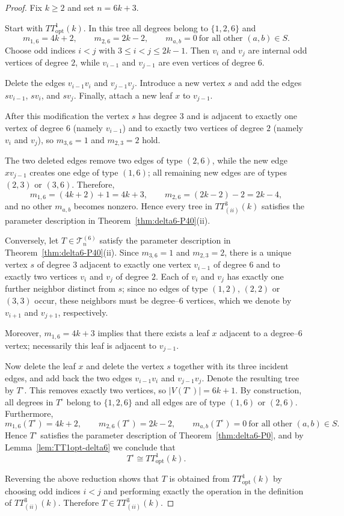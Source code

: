 \documentclass[preprint,12pt]{elsarticle}
\begin{document}
\begin{proof}
Fix $k\ge 2$ and set $n=6k+3$.

Start with $TT^1_{\mathrm{opt}}(k)$.
In this tree all degrees belong to $\{1,2,6\}$ and
\[
m_{1,6}=4k+2,\qquad m_{2,6}=2k-2,
\qquad m_{a,b}=0\ \text{for all other }(a,b)\in S .
\]
Choose odd indices $i<j$ with $3\le i<j\le 2k-1$.
Then $v_i$ and $v_j$ are internal odd vertices of degree $2$, while
$v_{i-1}$ and $v_{j-1}$ are even vertices of degree $6$.

Delete the edges $v_{i-1}v_i$ and $v_{j-1}v_j$.
Introduce a new vertex $s$ and add the edges $sv_{i-1}$, $sv_i$, and $sv_j$.
Finally, attach a new leaf $x$ to $v_{j-1}$.

After this modification the vertex $s$ has degree $3$ and is adjacent to exactly
one vertex of degree $6$ (namely $v_{i-1}$) and to exactly two vertices of degree
$2$ (namely $v_i$ and $v_j$), so $m_{3,6}=1$ and $m_{2,3}=2$ hold.

The two deleted edges remove two edges of type $(2,6)$, while the new edge
$xv_{j-1}$ creates one edge of type $(1,6)$; all remaining new edges are of types
$(2,3)$ or $(3,6)$.
Therefore,
\[
m_{1,6}=(4k+2)+1=4k+3,\qquad
m_{2,6}=(2k-2)-2=2k-4,
\]
and no other $m_{a,b}$ becomes nonzero.
Hence every tree in $TT^{3}_{(ii)}(k)$ satisfies the parameter description in
Theorem~\ref{thm:delta6-P40}\textup{(ii)}.

Conversely, let $T\in\mathcal{T}^{(6)}_n$ satisfy the parameter description in
Theorem~\ref{thm:delta6-P40}\textup{(ii)}.
Since $m_{3,6}=1$ and $m_{2,3}=2$, there is a unique vertex $s$ of degree $3$
adjacent to exactly one vertex $v_{i-1}$ of degree $6$ and to exactly two
vertices $v_i$ and $v_j$ of degree $2$.
Each of $v_i$ and $v_j$ has exactly one further neighbor distinct from $s$; since
no edges of type $(1,2)$, $(2,2)$ or $(3,3)$ occur, these neighbors must be
degree--$6$ vertices, which we denote by $v_{i+1}$ and $v_{j+1}$, respectively.

Moreover, $m_{1,6}=4k+3$ implies that there exists a leaf $x$ adjacent to a
degree--$6$ vertex; necessarily this leaf is adjacent to $v_{j-1}$.

Now delete the leaf $x$ and delete the vertex $s$ together with its three
incident edges, and add back the two edges $v_{i-1}v_i$ and $v_{j-1}v_j$.
Denote the resulting tree by $T^\circ$.
This removes exactly two vertices, so $|V(T^\circ)|=6k+1$.
By construction, all degrees in $T^\circ$ belong to $\{1,2,6\}$ and all edges are
of type $(1,6)$ or $(2,6)$.
Furthermore,
\[
m_{1,6}(T^\circ)=4k+2,\qquad
m_{2,6}(T^\circ)=2k-2,
\qquad
m_{a,b}(T^\circ)=0\ \text{for all other }(a,b)\in S .
\]
Hence $T^\circ$ satisfies the parameter description of
Theorem~\ref{thm:delta6-P0}, and by Lemma~\ref{lem:TT1opt-delta6} we conclude that
\[
T^\circ \cong TT^1_{\mathrm{opt}}(k).
\]

Reversing the above reduction shows that $T$ is obtained from
$TT^1_{\mathrm{opt}}(k)$ by choosing odd indices $i<j$ and performing exactly the
operation in the definition of $TT^{3}_{(ii)}(k)$.
Therefore $T\in TT^{3}_{(ii)}(k)$.
\end{proof}
\end{document}
